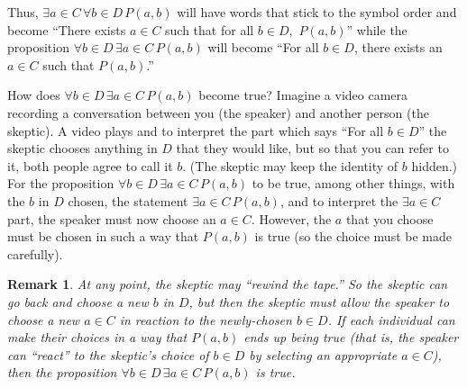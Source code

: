 \documentclass{book}
\newcounter{ekcounter}%
\theoremstyle{ekimcustom}
\newtheorem{remark}[ekcounter]{Remark}
\begin{document}
Thus, 
$\exists a \in C\,\forall b \in D \, P(a,b)$ 
will have words that stick to the symbol order and become ``There exists $a \in C$ such that for all $b \in D$,\, $P(a,b)$'' while the proposition
$\forall b \in D\,\exists a \in C\,P(a,b)$
will become ``For all $b \in D$, there exists an $a \in C$ such that $P(a,b)$.''

How does $\forall b \in D\,\exists a \in C\,P(a,b)$ become true? Imagine a video camera recording a conversation between you (the speaker) and another person (the skeptic). A video plays and to interpret the part which says ``For all $b \in D$'' the skeptic chooses anything in $D$ that they would like, but so that you can refer to it, both people agree to call it $b$. (The skeptic may keep the identity of $b$ hidden.) For the proposition $\forall b \in D\,\exists a \in C\,P(a,b)$ to be true, among other things, with the $b$ in $D$ chosen, the statement $\exists a \in C\,P(a,b)$, and to interpret the $\exists a \in C$ part, the speaker must now choose an $a \in C$. However, the $a$ that you choose must be chosen in such a way that $P(a,b)$ is true (so the choice must be made carefully).

\begin{remark}\label{remark:rewind-the-tape}
At any point, the skeptic may ``rewind the tape.'' So the skeptic can go back and choose a new $b$ in $D$, but then the skeptic must allow the speaker to choose a new $a \in C$ in reaction to the newly-chosen $b \in D$. If each individual can make their choices in a way that $P(a,b)$ ends up being true (that is, the speaker can ``react'' to the skeptic's choice of $b \in D$ by selecting an appropriate $a \in C$), then the proposition $\forall b \in D\,\exists a \in C\,P(a,b)$ is true.
\end{remark}
\end{document}
